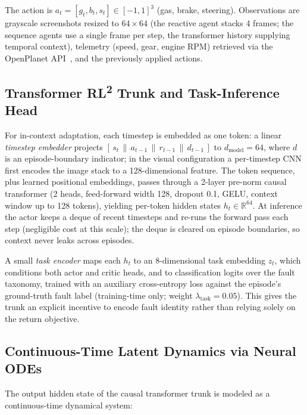 \documentclass[conference]{IEEEtran}
\newcommand{\rltwo}{RL\textsuperscript{2}}
\begin{document}
The action is $a_t = [g_t, b_t, s_t] \in [-1, 1]^3$ (gas, brake, steering). Observations are grayscale screenshots resized to $64 \times 64$ (the reactive agent stacks 4 frames; the sequence agents use a single frame per step, the transformer history supplying temporal context), telemetry (speed, gear, engine RPM) retrieved via the OpenPlanet API~\cite{openplanet}, and the previously applied actions.



\subsection{Transformer \rltwo{} Trunk and Task-Inference Head}

\label{sec:trunk}

For in-context adaptation, each timestep is embedded as one token: a linear \emph{timestep embedder} projects $[\,s_t \,\|\, a_{t-1} \,\|\, r_{t-1} \,\|\, d_{t-1}\,]$ to $d_{\text{model}} = 64$, where $d$ is an episode-boundary indicator; in the visual configuration a per-timestep CNN first encodes the image stack to a 128-dimensional feature. The token sequence, plus learned positional embeddings, passes through a 2-layer pre-norm causal transformer (2 heads, feed-forward width 128, dropout 0.1, GELU, context window up to 128 tokens), yielding per-token hidden states $h_t \in \mathbb{R}^{64}$. At inference the actor keeps a deque of recent timesteps and re-runs the forward pass each step (negligible cost at this scale); the deque is cleared on episode boundaries, so context never leaks across episodes.



A small \emph{task encoder} maps each $h_t$ to an 8-dimensional task embedding $z_t$, which conditions both actor and critic heads, and to classification logits over the fault taxonomy, trained with an auxiliary cross-entropy loss against the episode's ground-truth fault label (training-time only; weight $\lambda_{\text{task}} = 0.05$). This gives the trunk an explicit incentive to encode fault identity rather than relying solely on the return objective.



\subsection{Continuous-Time Latent Dynamics via Neural ODEs}

\label{sec:node}

The output hidden state of the causal transformer trunk is modeled as a continuous-time dynamical system:
\end{document}
